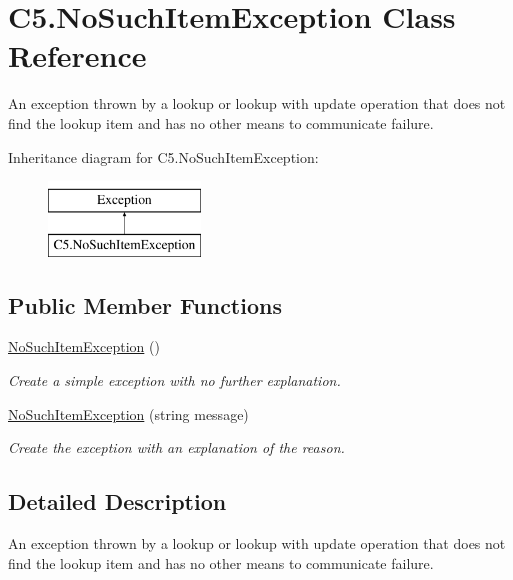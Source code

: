 \hypertarget{class_c5_1_1_no_such_item_exception}{}\section{C5.\+No\+Such\+Item\+Exception Class Reference}
\label{class_c5_1_1_no_such_item_exception}


An exception thrown by a lookup or lookup with update operation that does not find the lookup item and has no other means to communicate failure.  


Inheritance diagram for C5.\+No\+Such\+Item\+Exception\+:\begin{figure}[H]
\begin{center}
\leavevmode
\includegraphics[height=2.000000cm]{class_c5_1_1_no_such_item_exception}
\end{center}
\end{figure}
\subsection*{Public Member Functions}
\begin{DoxyCompactItemize}
\item 
\hyperlink{class_c5_1_1_no_such_item_exception_af763b193650763139449dfbfbf0d67bf}{No\+Such\+Item\+Exception} ()
\begin{DoxyCompactList}\small\item\em Create a simple exception with no further explanation. \end{DoxyCompactList}\item 
\hyperlink{class_c5_1_1_no_such_item_exception_ae433e0438e75cee36b6a2ca25a870f15}{No\+Such\+Item\+Exception} (string message)
\begin{DoxyCompactList}\small\item\em Create the exception with an explanation of the reason. \end{DoxyCompactList}\end{DoxyCompactItemize}


\subsection{Detailed Description}
An exception thrown by a lookup or lookup with update operation that does not find the lookup item and has no other means to communicate failure. 

